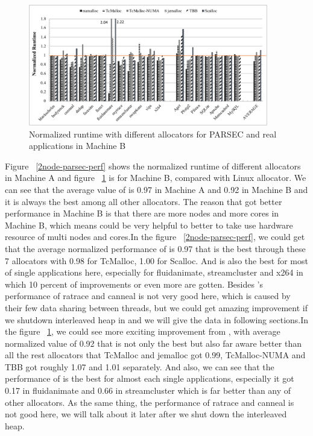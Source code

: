 \begin{figure}[H]
    \centering
    \includegraphics[width=\textwidth,height=200]{paper/figure/8-node-parsec-perf.pdf}
    \caption{Normalized runtime with different allocators for PARSEC and real applications in Machine B}
    \label{8node-parsec-perf}
\end{figure}

Figure ~\ref{2node-parsec-perf} shows the normalized runtime of different allocators in Machine A and figure ~\ref{8node-parsec-perf} is for Machine B, compared with Linux allocator. We can see that the average value of \NM{} is 0.97 in Machine A and 0.92 in Machine B and it is always the best among all other allocators. The reason that \NM{} got better performance in Machine B is that there are more nodes and more cores in Machine B, which means \NM{} could be very helpful to better to take use hardware resource of multi nodes and cores.In the figure ~\ref{2node-parsec-perf}, we could get that the average normalized performance of \NM{} is 0.97 that is the best through these 7 allocators with 0.98 for TcMalloc, 1.00 for Scalloc. And \NM{} is also the best for most of single applications here, especially for fluidanimate, streamcluster and x264 in which 10 percent of improvements or even more are gotten. Besides \NM{}'s performance of  ratrace and canneal is not very good here, which is caused by their few data sharing between threads, but we could get amazing improvement if we shutdown interleaved heap in \NM{} and we will give the data in following sections.In the figure ~\ref{8node-parsec-perf}, we could see more exciting improvement from \NM{}, with average normalized value of 0.92 that is not only the best but also far aware better than all the rest allocators that TcMalloc and jemalloc got 0.99, TcMalloc-NUMA and TBB got roughly 1.07 and 1.01 separately. And also, we can see that the performance of \NM{} is the best for almost each single applications, especially it got 0.17 in fluidanimate and 0.66 in streamcluster which is far better than any of other allocators. As the same thing, the performance of ratrace and canneal is not good here, we will talk about it later after we shut down the interleaved heap.

